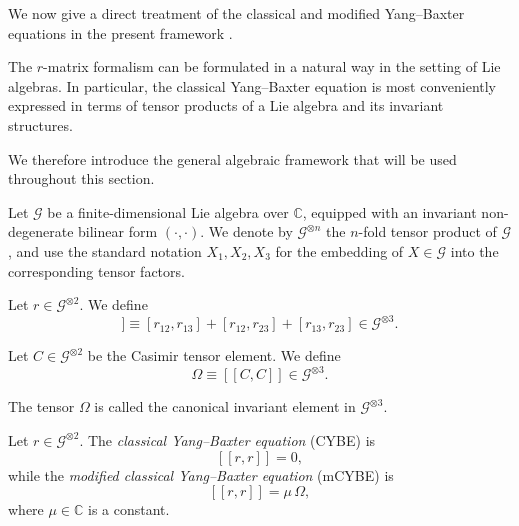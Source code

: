 We now give a direct treatment of the classical and modified Yang–Baxter equations in the present framework \cite{SemenovTyanShanskii1983,Sklyanin1982}.

The $r$-matrix formalism can be formulated in a natural way in the setting of Lie algebras. In particular, the classical Yang--Baxter equation is most conveniently expressed in terms of tensor products of a Lie algebra and its invariant structures.

We therefore introduce the general algebraic framework that will be used throughout this section.

\begin{definition}
    Let $\mathcal{G}$ be a finite-dimensional Lie algebra over $\mathbb{C}$, equipped with an invariant non-degenerate bilinear form $(\cdot,\cdot)$. We denote by $\mathcal{G}^{\otimes n}$ the $n$-fold tensor product of $\mathcal{G}$, and use the standard notation $X_1, X_2, X_3$ for the embedding of $X \in \mathcal{G}$ into the corresponding tensor factors.
\end{definition}

\begin{definition}\label{def:double_bracket}
    Let $r \in \mathcal{G}^{\otimes 2}$. We define
    \begin{equation}
        [[r,r]] \equiv [r_{12},r_{13}] + [r_{12},r_{23}] + [r_{13},r_{23}]
        \in \mathcal{G}^{\otimes 3}.
    \end{equation}
\end{definition}
\begin{definition}
    Let $C \in \mathcal{G}^{\otimes 2}$ be the Casimir tensor element.  
    We define
    \begin{equation}
        \Omega \equiv [[C,C]] \in \mathcal{G}^{\otimes 3}.
    \end{equation}
\end{definition}
\begin{remark}
    The tensor $\Omega$ is called the canonical invariant element in $\mathcal{G}^{\otimes 3}$.
\end{remark}
\begin{definition}
    Let $r \in \mathcal{G}^{\otimes 2}$. The \emph{classical Yang--Baxter equation} (CYBE) is
    \begin{equation} \label{eq:CYBE}
        [[r,r]] = 0,
    \end{equation}
    while the \emph{modified classical Yang--Baxter equation} (mCYBE) is
    \begin{equation} \label{eq:mCYBE}
        [[r,r]] = \mu \, \Omega,
    \end{equation}
    where $\mu \in \mathbb{C}$ is a constant.
\end{definition}

